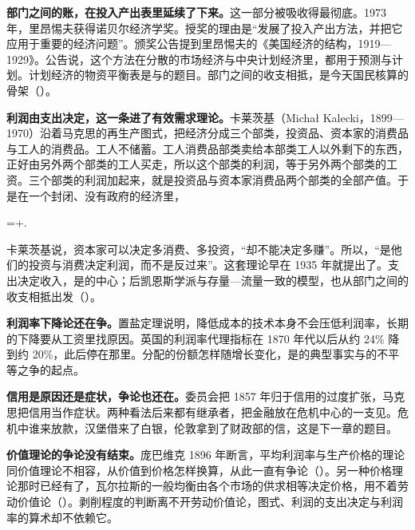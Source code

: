 \textbf{部门之间的账，在投入产出表里延续了下来。}这一部分被吸收得最彻底。1973 年，里昂惕夫获得诺贝尔经济学奖。授奖的理由是“发展了投入产出方法，并把它应用于重要的经济问题”\cite{nobel1973}。颁奖公告提到里昂惕夫的《美国经济的结构，1919—1929》\cite{nobel1973}。公告说，这个方法在分散的市场经济与中央计划经济里，都用于预测与计划\cite{nobel1973}。计划经济的物资平衡表是与的题目。部门之间的收支相抵，是今天国民核算的骨架（）。

\textbf{利润由支出决定，这一条进了有效需求理论。}卡莱茨基（Michał Kalecki，1899—1970）沿着马克思的再生产图式，把经济分成三个部类，投资品、资本家的消费品与工人的消费品\cite{kalecki1954}。工人不储蓄。工人消费品部类卖给本部类工人以外剩下的东西，正好由另外两个部类的工人买走，所以这个部类的利润，等于另外两个部类的工资。三个部类的利润加起来，就是投资品与资本家消费品两个部类的全部产值。于是在一个封闭、没有政府的经济里\cite{kalecki1954}，
\begin{keyeq}
=+.\label{eq:marx-kalecki}
\end{keyeq}
卡莱茨基说，资本家可以决定多消费、多投资，“却不能决定多赚”\cite{kalecki1954}。所以，“是他们的投资与消费决定利润，而不是反过来”\cite{kalecki1954}。这套理论早在 1935 年就提出了\cite{kalecki1954}。支出决定收入，是的中心；后凯恩斯学派与存量—流量一致的模型，也从部门之间的收支相抵出发（）。

\textbf{利润率下降论还在争。}置盐定理说明，降低成本的技术本身不会压低利润率，长期的下降要从工资里找原因。英国的利润率代理指标在 1870 年代以后从约 24\% 降到约 20\%，此后停在那里。分配的份额怎样随增长变化，是的典型事实与的不平等之争的起点。

\textbf{信用是原因还是症状，争论也还在。}委员会把 1857 年归于信用的过度扩张，马克思把信用当作症状。两种看法后来都有继承者，把金融放在危机中心的一支见。危机中谁来放款，汉堡借来了白银，伦敦拿到了财政部的信，这是下一章的题目。

\textbf{价值理论的争论没有结束。}庞巴维克 1896 年断言，平均利润率与生产价格的理论同价值理论不相容\cite{bohm1896}，从价值到价格怎样换算，从此一直有争论（）。另一种价格理论那时已经有了，瓦尔拉斯的一般均衡由各个市场的供求相等决定价格，用不着劳动价值论（）。剥削程度的判断离不开劳动价值论，图式、利润的支出决定与利润率的算术却不依赖它。


